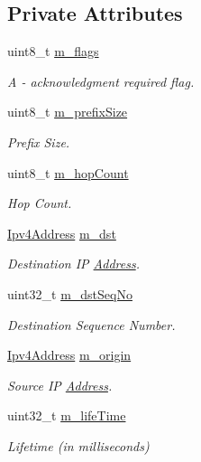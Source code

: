 \subsection*{Private Attributes}
\begin{DoxyCompactItemize}
\item 
uint8\+\_\+t \hyperlink{classns3_1_1aodv_1_1RrepHeader_abad4f56856926c4769c14ba3b87cc346}{m\+\_\+flags}
\begin{DoxyCompactList}\small\item\em A -\/ acknowledgment required flag. \end{DoxyCompactList}\item 
uint8\+\_\+t \hyperlink{classns3_1_1aodv_1_1RrepHeader_ad61022220a19231c0ebee9cd88e03d75}{m\+\_\+prefix\+Size}
\begin{DoxyCompactList}\small\item\em Prefix Size. \end{DoxyCompactList}\item 
uint8\+\_\+t \hyperlink{classns3_1_1aodv_1_1RrepHeader_ac0cd2013d6975e4a8668dd831d488ab3}{m\+\_\+hop\+Count}
\begin{DoxyCompactList}\small\item\em Hop Count. \end{DoxyCompactList}\item 
\hyperlink{classns3_1_1Ipv4Address}{Ipv4\+Address} \hyperlink{classns3_1_1aodv_1_1RrepHeader_aa9c52642173e2579173d70d47f680aef}{m\+\_\+dst}
\begin{DoxyCompactList}\small\item\em Destination IP \hyperlink{classns3_1_1Address}{Address}. \end{DoxyCompactList}\item 
uint32\+\_\+t \hyperlink{classns3_1_1aodv_1_1RrepHeader_a9024023f050c8650031234b8f2a60cb6}{m\+\_\+dst\+Seq\+No}
\begin{DoxyCompactList}\small\item\em Destination Sequence Number. \end{DoxyCompactList}\item 
\hyperlink{classns3_1_1Ipv4Address}{Ipv4\+Address} \hyperlink{classns3_1_1aodv_1_1RrepHeader_ae9cb0d9d6a1ee8dd41603ed7c1128532}{m\+\_\+origin}
\begin{DoxyCompactList}\small\item\em Source IP \hyperlink{classns3_1_1Address}{Address}. \end{DoxyCompactList}\item 
uint32\+\_\+t \hyperlink{classns3_1_1aodv_1_1RrepHeader_aed5f49edff52cee3f48713ef5f0bc8a2}{m\+\_\+life\+Time}
\begin{DoxyCompactList}\small\item\em Lifetime (in milliseconds) \end{DoxyCompactList}\end{DoxyCompactItemize}
